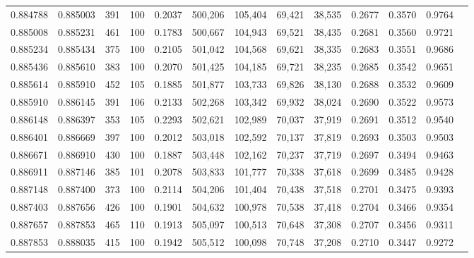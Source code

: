 \begin{tabular}{rrrrrrrrrrrrr}
0.884788 & 0.885003 &   391 & 100 &                                     0.2037 & 500,206 & 105,404 &  69,421 &  38,535 & 0.2677 & 0.3570 & 0.9764 \\
0.885008 & 0.885231 &   461 & 100 &                                     0.1783 & 500,667 & 104,943 &  69,521 &  38,435 & 0.2681 & 0.3560 & 0.9721 \\
0.885234 & 0.885434 &   375 & 100 &                                     0.2105 & 501,042 & 104,568 &  69,621 &  38,335 & 0.2683 & 0.3551 & 0.9686 \\
0.885436 & 0.885610 &   383 & 100 &                                     0.2070 & 501,425 & 104,185 &  69,721 &  38,235 & 0.2685 & 0.3542 & 0.9651 \\
0.885614 & 0.885910 &   452 & 105 &                                     0.1885 & 501,877 & 103,733 &  69,826 &  38,130 & 0.2688 & 0.3532 & 0.9609 \\
0.885910 & 0.886145 &   391 & 106 &                                     0.2133 & 502,268 & 103,342 &  69,932 &  38,024 & 0.2690 & 0.3522 & 0.9573 \\
0.886148 & 0.886397 &   353 & 105 &                                     0.2293 & 502,621 & 102,989 &  70,037 &  37,919 & 0.2691 & 0.3512 & 0.9540 \\
0.886401 & 0.886669 &   397 & 100 &                                     0.2012 & 503,018 & 102,592 &  70,137 &  37,819 & 0.2693 & 0.3503 & 0.9503 \\
0.886671 & 0.886910 &   430 & 100 &                                     0.1887 & 503,448 & 102,162 &  70,237 &  37,719 & 0.2697 & 0.3494 & 0.9463 \\
0.886911 & 0.887146 &   385 & 101 &                                     0.2078 & 503,833 & 101,777 &  70,338 &  37,618 & 0.2699 & 0.3485 & 0.9428 \\
0.887148 & 0.887400 &   373 & 100 &                                     0.2114 & 504,206 & 101,404 &  70,438 &  37,518 & 0.2701 & 0.3475 & 0.9393 \\
0.887403 & 0.887656 &   426 & 100 &                                     0.1901 & 504,632 & 100,978 &  70,538 &  37,418 & 0.2704 & 0.3466 & 0.9354 \\
0.887657 & 0.887853 &   465 & 110 &                                     0.1913 & 505,097 & 100,513 &  70,648 &  37,308 & 0.2707 & 0.3456 & 0.9311 \\
0.887853 & 0.888035 &   415 & 100 &                                     0.1942 & 505,512 & 100,098 &  70,748 &  37,208 & 0.2710 & 0.3447 & 0.9272 \\

\end{tabular}
